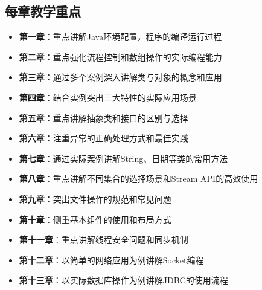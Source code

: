 \documentclass{../note}
\begin{document}
\subsection{每章教学重点}
\begin{itemize}
  \item \textbf{第一章}：重点讲解Java环境配置，程序的编译运行过程
  \item \textbf{第二章}：重点强化流程控制和数组操作的实际编程能力
  \item \textbf{第三章}：通过多个案例深入讲解类与对象的概念和应用
  \item \textbf{第四章}：结合实例突出三大特性的实际应用场景
  \item \textbf{第五章}：重点讲解抽象类和接口的区别与选择
  \item \textbf{第六章}：注重异常的正确处理方式和最佳实践
  \item \textbf{第七章}：通过实际案例讲解String、日期等类的常用方法
  \item \textbf{第八章}：重点讲解不同集合的选择场景和Stream API的高效使用
  \item \textbf{第九章}：突出文件操作的规范和常见问题
  \item \textbf{第十章}：侧重基本组件的使用和布局方式
  \item \textbf{第十一章}：重点讲解线程安全问题和同步机制
  \item \textbf{第十二章}：以简单的网络应用为例讲解Socket编程
  \item \textbf{第十三章}：以实际数据库操作为例讲解JDBC的使用流程
\end{itemize}
\end{document}
